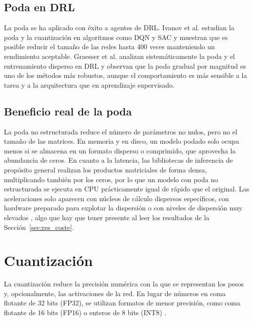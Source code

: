 \subsection{Poda en DRL}

La poda se ha aplicado con éxito a agentes de DRL. Ivanov et al. \cite{ivanov2025neural} estudian la poda y la cuantización en algoritmos como DQN y SAC y muestran que es posible reducir el tamaño de las redes hasta 400 veces manteniendo un rendimiento aceptable. Graesser et al. \cite{graesser2022state} analizan sistemáticamente la poda y el entrenamiento disperso en DRL y observan que la poda gradual por magnitud es uno de los métodos más robustos, aunque el comportamiento es más sensible a la tarea y a la arquitectura que en aprendizaje supervisado.

\subsection{Beneficio real de la poda}

La poda no estructurada reduce el número de parámetros no nulos, pero no el tamaño de las matrices. En memoria y en disco, un modelo podado solo ocupa menos si se almacena en un formato disperso o comprimido, que aprovecha la abundancia de ceros. En cuanto a la latencia, las bibliotecas de inferencia de propósito general realizan los productos matriciales de forma densa, multiplicando también por los ceros, por lo que un modelo con poda no estructurada se ejecuta en CPU prácticamente igual de rápido que el original. Las aceleraciones solo aparecen con núcleos de cálculo dispersos específicos, con hardware preparado para explotar la dispersión o con niveles de dispersión muy elevados \cite{hoefler2021sparsity}, algo que hay que tener presente al leer los resultados de la Sección~\ref{sec:res_coste}.

\section{Cuantización}\label{sec:cuantizacion}

La cuantización reduce la precisión numérica con la que se representan los pesos y, opcionalmente, las activaciones de la red. En lugar de números en coma flotante de 32 bits (FP32), se utilizan formatos de menor precisión, como coma flotante de 16 bits (FP16) o enteros de 8 bits (INT8) \cite{jacob2018quantization,nagel2021white}.

